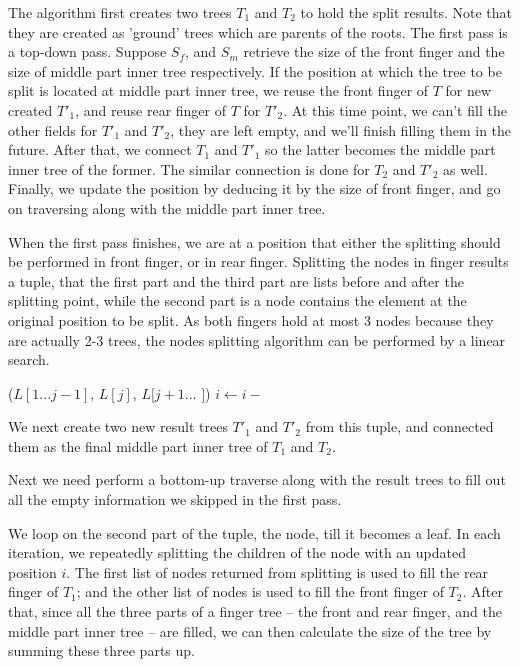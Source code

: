 \documentclass[UTF8]{article}
\begin{document}
The algorithm first creates two trees $T_1$ and $T_2$ to hold the split results. Note that
they are created as 'ground' trees which are parents of the roots. The first pass is
a top-down pass. Suppose $S_f$, and $S_m$ retrieve the size of the front finger and the size of middle part
inner tree respectively. If the position at which the tree to be split is located at middle part inner tree,
we reuse the front finger of $T$ for new created $T'_1$, and reuse rear finger of $T$ for $T'_2$.
At this time point, we can't fill the other fields for $T'_1$ and $T'_2$, they are left empty, and
we'll finish filling them in the future. After that, we connect $T_1$ and $T'_1$ so the latter becomes
the middle part inner tree of the former. The similar connection is done for $T_2$ and $T'_2$ as well.
Finally, we update the position by deducing it by the size of front finger, and go on traversing along
with the middle part inner tree.

When the first pass finishes, we are at a position that either the splitting should be performed
in front finger, or in rear finger. Splitting the nodes in finger results a tuple, that
the first part and the third part are lists before and after the splitting point, while the second
part is a node contains the element at the original position to be split.
As both fingers hold at most 3 nodes because they are actually 2-3 trees, the nodes splitting
algorithm can be performed by a linear search.

\begin{algorithmic}
      \State \Return ($L[1...j-1]$, $L[j]$, $L[j+1...$  $]$)
    \EndIf
    \State $i \gets i -$ 
  \EndFor
\EndFunction
\end{algorithmic}

We next create two new result trees $T'_1$ and $T'_2$ from this tuple, and connected them as the
final middle part inner tree of $T_1$ and $T_2$.

Next we need perform a bottom-up traverse along with the result trees to fill out all the empty
information we skipped in the first pass.

We loop on the second part of the tuple, the node, till it becomes a leaf. In each iteration, we
repeatedly splitting the children of the node with an updated position $i$. The first list of
nodes returned from splitting is used to fill the rear finger of $T_1$; and the other list of
nodes is used to fill the front finger of $T_2$. After that, since all the three parts of a
finger tree -- the front and rear finger, and the middle part inner tree -- are filled, we
can then calculate the size of the tree by summing these three parts up.
\end{document}
